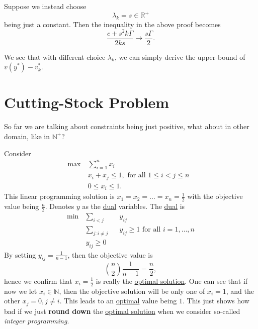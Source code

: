 \begin{remark}
	Suppose we instead choose
	\[
		\lambda_{k} = s\in\mathbb{R}^+
	\]
	being just a constant. Then the inequality in the above proof becomes
	\[
		\frac{c + s^2 k \Gamma }{2 k s}\to \frac{s \Gamma}{2}.
	\]

	We see that with different choice \(\lambda_{k}\), we can simply derive the upper-bound of \(v(y^{\ast}) - v^{\ast}_{k}\).
\end{remark}

\section{Cutting-Stock Problem}
So far we are talking about constraints being just positive, what about in other domain, like in \(\mathbb{N}^+\)?

Consider
\[
	\begin{aligned}
		\max~ & \sum\limits_{i=1}^{n} x_{i}                              \\
		      & x_{i}+x_{j}\leq 1, \text{ for all \(1\leq i< j\leq n\) } \\
		      & 0\leq x_{i}\leq 1.
	\end{aligned}
\]
This linear programming solution is \(x_1 = x_2 = \ldots  = x_n = \frac{1}{2}\) with the objective value being \(\frac{n}{2}\). Denotes \(y\) as the \hyperref[def:dual]{dual} variables. The \hyperref[def:dual]{dual} is
\[
	\begin{alignedat}{3}
		\min~ & \sum\limits_{i<j}            && y_{ij}                                             \\
		& \sum\limits_{j\colon i\neq j} && y_{ij}\geq 1 \text{ for all \(i = 1, \ldots , n\)} \\
		& y_{ij}\geq 0
	\end{alignedat}
\]
By setting \(y_{ij} = \frac{1}{n-1}\), then the objective value is
\[
	\binom{n}{2}\frac{1}{n-1} = \frac{n}{2},
\]
hence we confirm that \(x_{i} = \frac{1}{2}\) is really the \hyperref[def:optimal-solution]{optimal solution}. One can see that if now we let \(x_{i}\in\mathbb{N}\), then the objective solution will be only one of \(x_{i} = 1\), and the other \(x_{j} = 0, j\neq i\). This leads to an \hyperref[def:optimal-solution]{optimal} value being \(1\). This just shows how bad if we just \textbf{round down} the \hyperref[def:optimal-solution]{optimal solution} when we consider so-called \emph{integer programming}.